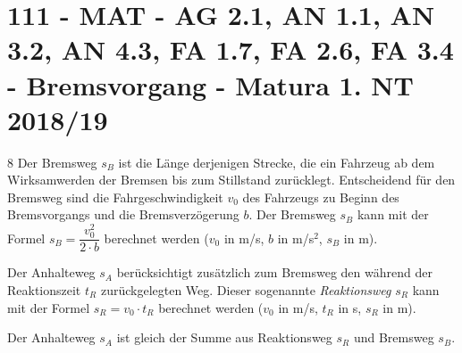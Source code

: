 \section{111 - MAT - AG 2.1, AN 1.1, AN 3.2, AN 4.3, FA 1.7, FA 2.6, FA 3.4 - Bremsvorgang - Matura 1. NT 2018/19}

\begin{langesbeispiel} \item[8] %
Der Bremsweg $s_B$ ist die Länge derjenigen Strecke, die ein Fahrzeug ab dem Wirksamwerden der Bremsen bis zum Stillstand zurücklegt. Entscheidend für den Bremsweg sind die Fahrgeschwindigkeit $v_0$ des Fahrzeugs zu Beginn des Bremsvorgangs und die Bremsverzögerung $b$. Der Bremsweg $s_B$ kann mit der Formel $s_B=\dfrac{v_0^2}{2\cdot b}$ berechnet werden ($v_0$ in m/s, $b$ in m/s$^2$, $s_B$ in m).
		
		Der Anhalteweg $s_A$ berücksichtigt zusätzlich zum Bremsweg den während der Reaktionszeit $t_R$ zurückgelegten Weg. Dieser sogenannte \textit{Reaktionsweg} $s_R$ kann mit der Formel $s_R=v_0\cdot t_R$ berechnet werden ($v_0$ in m/s, $t_R$ in s, $s_R$ in m).
		
		Der Anhalteweg $s_A$ ist gleich der Summe aus Reaktionsweg $s_R$ und Bremsweg $s_B$.%

\begin{aufgabenstellung}
\item %



\end{aufgabenstellung}
\end{langesbeispiel}
